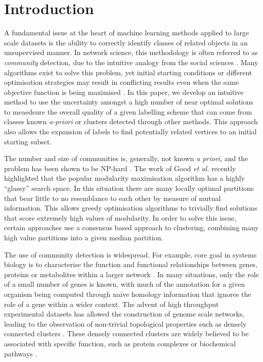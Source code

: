 \documentclass[manuscript, proceedings]{acmart}
\begin{document}
\section{Introduction}

A fundamental issue at the heart of machine learning methods applied to large scale datasets is the ability to correctly identify classes of related objects in an unsupervised manner.
In network science, this methodology is often referred to as \textit{community} detection, due to the intuitive analogy from the social sciences \cite{fortunato2010community}.
Many algorithms exist to solve this problem, yet initial starting conditions or different optimisation strategies may result in conflicting results even when the same objective function is being maximised \cite{good2010performance}.
In this paper, we develop an intuitive method to use the uncertainty amongst a high number of near optimal solutions to meaedsure the overall quality of a given labelling scheme that can come from classes known \textit{a-priori} or clusters detected through other methods.
This approach also allows the expansion of labels to find potentially related vertices to an initial starting subset.

The number and size of communities is, generally, not known \textit{a priori}, and the problem has been shown to be NP-hard \cite{npHardModularity}.
The work of Good \textit{et al.} \cite{good2010performance} recently highlighted that the popular modularity maximisation algorithm has a highly ``glassy'' search space.
In this situation there are many locally optimal partitions that bear little to no resemblance to each other by measure of mutual information.
This allows greedy optimisation algorithms \cite{blondel2008fast} to trivially find solutions that score extremely high values of modularity.
In order to solve this issue, certain approaches use a consensus based approach to clustering, combining many high value partitions into a given median partition.

The use of community detection is widespread.
For example, core goal in systems biology is to characterise the function and functional relationships between genes, proteins or metabolites within a larger network \cite{}.
In many situations, only the role of a small number of genes is known, with much of the annotation for a given organism being computed through naive homology information that ignores the role of a gene within a wider context.
The advent of high throughput experimental datasets has allowed the construction of genome scale networks, leading to the observation of non-trivial topological properties such as densely connected clusters \cite{ArabidopsisConsortium2011}.
These densely connected clusters are widely believed to be associated with specific function, such as protein complexes or biochemical pathways \cite{}.
\end{document}
